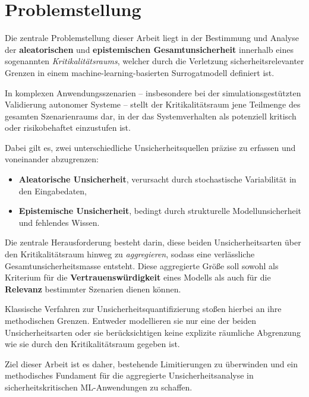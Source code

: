 
\chapter{Problemstellung}
\label{chapter:problemstellung}

Die zentrale Problemstellung dieser Arbeit liegt in der Bestimmung und Analyse der \textbf{aleatorischen} und \textbf{epistemischen Gesamtunsicherheit} innerhalb eines sogenannten \emph{Kritikalitätsraums}, welcher durch die Verletzung sicherheitsrelevanter Grenzen in einem machine-learning-basierten Surrogatmodell definiert ist.

In komplexen Anwendungsszenarien – insbesondere bei der simulationsgestützten Validierung autonomer Systeme – stellt der Kritikalitätsraum jene Teilmenge des gesamten Szenarienraums dar, in der das Systemverhalten als potenziell kritisch oder risikobehaftet einzustufen ist.

Dabei gilt es, zwei unterschiedliche Unsicherheitsquellen präzise zu erfassen und voneinander abzugrenzen:

\begin{itemize}
  \item \textbf{Aleatorische Unsicherheit}, verursacht durch stochastische Variabilität in den Eingabedaten,
  \item \textbf{Epistemische Unsicherheit}, bedingt durch strukturelle Modellunsicherheit und fehlendes Wissen.
\end{itemize}

Die zentrale Herausforderung besteht darin, diese beiden Unsicherheitsarten über den Kritikalitätsraum hinweg zu \emph{aggregieren}, sodass eine verlässliche Gesamtunsicherheitsmasse entsteht. Diese aggregierte Größe soll sowohl als Kriterium für die \textbf{Vertrauenswürdigkeit} eines Modells als auch für die \textbf{Relevanz} bestimmter Szenarien dienen können.

Klassische Verfahren zur Unsicherheitsquantifizierung stoßen hierbei an ihre methodischen Grenzen. Entweder modellieren sie nur eine der beiden Unsicherheitsarten oder sie berücksichtigen keine explizite räumliche Abgrenzung wie sie durch den Kritikalitätsraum gegeben ist.

Ziel dieser Arbeit ist es daher, bestehende Limitierungen zu überwinden und ein methodisches Fundament für die aggregierte Unsicherheitsanalyse in sicherheitskritischen ML-Anwendungen zu schaffen.
